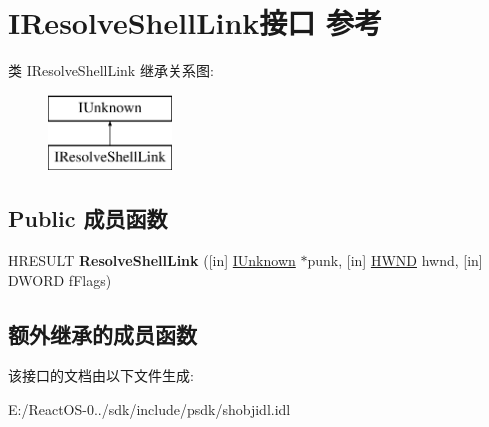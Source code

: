 \hypertarget{interface_i_resolve_shell_link}{}\section{I\+Resolve\+Shell\+Link接口 参考}
\label{interface_i_resolve_shell_link}
类 I\+Resolve\+Shell\+Link 继承关系图\+:\begin{figure}[H]
\begin{center}
\leavevmode
\includegraphics[height=2.000000cm]{interface_i_resolve_shell_link}
\end{center}
\end{figure}
\subsection*{Public 成员函数}
\begin{DoxyCompactItemize}
\item 
\mbox{\label{interface_i_resolve_shell_link_a6ea5c69863505472b6c0d364c9852bd6}} 
H\+R\+E\+S\+U\+LT {\bfseries Resolve\+Shell\+Link} (\mbox{[}in\mbox{]} \hyperlink{interface_i_unknown}{I\+Unknown} $\ast$punk, \mbox{[}in\mbox{]} \hyperlink{interfacevoid}{H\+W\+ND} hwnd, \mbox{[}in\mbox{]} D\+W\+O\+RD f\+Flags)
\end{DoxyCompactItemize}
\subsection*{额外继承的成员函数}


该接口的文档由以下文件生成\+:\begin{DoxyCompactItemize}
\item 
E\+:/\+React\+O\+S-\/0../sdk/include/psdk/shobjidl.\+idl\end{DoxyCompactItemize}
